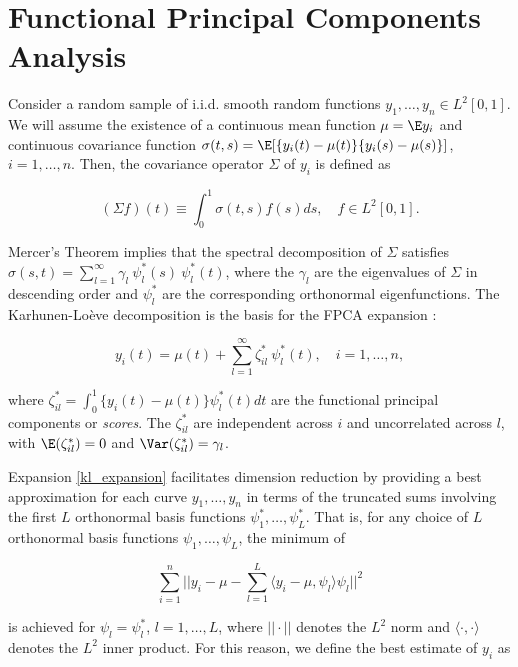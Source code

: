 \documentclass[12pt]{article}
\theoremstyle{plain}
\theoremstyle{definition}
\theoremstyle{remark}
\begin{document}
\section{Functional Principal Components Analysis}
\label{sec:fpca}

Consider a random sample of i.i.d. smooth random functions $y_1, \dots, y_n \in L^2 [0, 1]$. We will assume the
existence of a continuous mean function $\mu = \E y_i$ and continuous covariance function
$\sigma (t, s) = \E [ \{ y_i (t) - \mu (t) \} \{ y_i (s) - \mu (s) \} ]$, $i = 1, \dots, n$.
Then, the covariance operator $\Sigma$ of $y_i$ is defined as

\begin{equation}
	(\Sigma f) (t) \equiv \int_0^1 \sigma (t, s) f(s) ds, \quad f \in L^2 [0, 1].
\label{cov_op}
\end{equation}

\noindent Mercer's Theorem implies that the spectral decomposition of $\Sigma$ satisfies $\sigma (s, t) =
\sum_{l=1}^\infty \gamma_l \ \psi^*_l (s) \ \psi^*_l (t)$, where the $\gamma_l$ are the eigenvalues of
$\Sigma$ in descending
order and $\psi^*_l$ are the corresponding orthonormal eigenfunctions. The Karhunen-Lo\`{e}ve decomposition
is the basis for the FPCA expansion \cite{yao05}:

\begin{equation}
	y_i (t) = \mu (t) + \sum_{l=1}^\infty \zeta^*_{il} \ \psi^*_l (t), \quad i = 1, \dots, n,
\label{kl_expansion}
\end{equation}

\noindent where $\zeta^*_{il} = \int_0^1 \{ y_i (t) - \mu(t) \} \psi^*_l(t) dt$ are the functional principal components or
\emph{scores}. The $\zeta^*_{il}$ are independent across $i$ and uncorrelated across $l$, with $\E (\zeta^*_{il}) = 0$
and $\Var (\zeta^*_{il}) = \gamma_l$.

Expansion \eqref{kl_expansion} facilitates dimension reduction by providing a best approximation for each
curve $y_1, \dots, y_n$ in terms of the truncated sums involving the first $L$ orthonormal basis functions
$\psi^*_1, \dots, \psi^*_L$. That is, for any choice of $L$ orthonormal basis functions $\psi_1, \dots, \psi_L$, the
minimum of

\[
	\sum_{i=1}^n || y_i - \mu - \sum_{l=1}^L \langle y_i - \mu , \psi_l \rangle \psi_l ||^2
\]

\noindent is achieved for $\psi_l = \psi^*_l$, $l = 1, \dots, L$, where $|| \cdot ||$ denotes the $L^2$ norm and
$\langle \cdot, \cdot \rangle$ denotes the $L^2$ inner product. For this reason, we define the best estimate of
$y_i$ as
\end{document}
